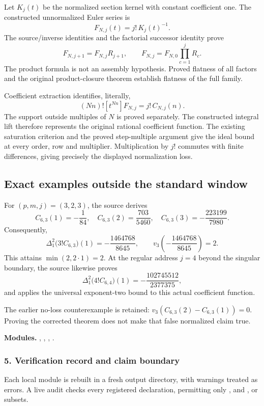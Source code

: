 Let $K_j(t)$ be the normalized section kernel with constant coefficient one. The constructed unnormalized Euler series is
\[
 F_{N,j}(t)=j!\,K_j(t)^{-1}.
\]
The source/inverse identities and the factorial successor identity prove
\[
 F_{N,j+1}=F_{N,j}R_{j+1},\qquad
 F_{N,j}=F_{N,0}\prod_{c=1}^{j}R_c.
\]
The product formula is not an assembly hypothesis. Proved flatness of all factors and the original product-closure theorem establish flatness of the full family.

Coefficient extraction identifies, literally,
\[
 (Nn)![t^{Nn}]F_{N,j}=j!\,C_{N,j}(n).
\]
The support outside multiples of $N$ is proved separately. The constructed integral lift therefore represents the original rational coefficient function. The existing saturation criterion and the proved step-multiple argument give the ideal bound at every order, row and multiplier. Multiplication by $j!$ commutes with finite differences, giving precisely the displayed normalization loss.

\subsection*{Exact examples outside the standard window}
For $(p,m,j)=(3,2,3)$, the source derives
\[
 C_{6,3}(1)=-\frac1{84},\quad C_{6,3}(2)=\frac{703}{5460},\quad
 C_{6,3}(3)=-\frac{223199}{7980}.
\]
Consequently,
\[
 \Delta_1^2\bigl(3!C_{6,3}\bigr)(1)=-\frac{1464768}{8645},\qquad
 v_3\!\left(-\frac{1464768}{8645}\right)=2.
\]
This attains $\min(2,2\cdot1)=2$. At the regular address $j=4$ beyond the singular boundary, the source likewise proves
\[
 \Delta_1^2\bigl(4!C_{6,4}\bigr)(1)=-\frac{102745512}{2377375},
\]
and applies the universal exponent-two bound to this actual coefficient function.

The earlier no-loss counterexample is retained: $v_3(C_{6,3}(2)-C_{6,3}(1))=0$. Proving the corrected theorem does not make that false normalized claim true.

\textbf{Modules.} , , , .
\par\medskip
\subsubsection*{5. Verification record and claim boundary}
Each local module is rebuilt in a fresh output directory, with warnings treated as errors. A live  audit checks every registered declaration, permitting only ,  and , or subsets.

